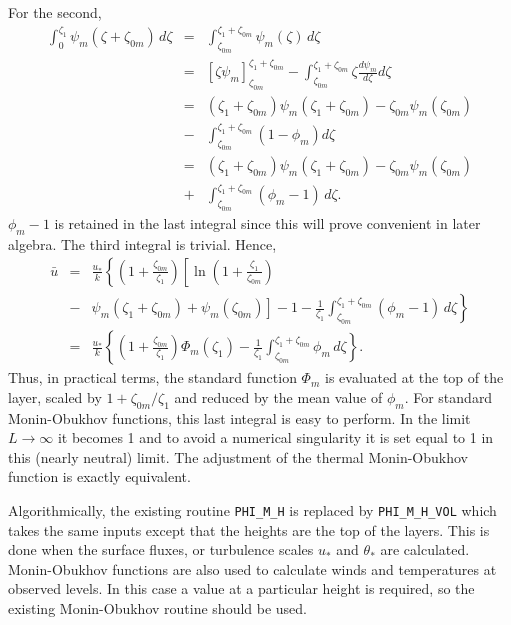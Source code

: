 \documentclass{UMDP_article}
\begin{document}
For the second,
\begin{eqnarray}
  \int_0^{\zeta_1} \psi_m(\zeta+\zeta_{0m}) \, d\zeta &=&
  \int_{\zeta_{0m}}^{\zeta_1+\zeta_{0m}} \psi_m(\zeta) \, d\zeta \\
  &=& \left [ \zeta \psi_m
  \right ]_{\zeta_{0m}}^{\zeta_1+\zeta_{0m}}
  - \int_{\zeta_{0m}}^{\zeta_1+\zeta_{0m}} \zeta \frac{d\psi_m}{d\zeta}
  d\zeta \nonumber \\
  &=& (\zeta_1+\zeta_{0m}) \psi_m(\zeta_1+\zeta_{0m}) - \zeta_{0m}
  \psi_m(\zeta_{0m}) \nonumber \\ &-& \int_{\zeta_{0m}}^{\zeta_1+\zeta_{0m}}
  (1-\phi_m) d\zeta \nonumber \\
  &=& (\zeta_1+\zeta_{0m}) \psi_m(\zeta_1+\zeta_{0m}) - \zeta_{0m}
  \psi_m(\zeta_{0m}) \nonumber \\ &+& \int_{\zeta_{0m}}^{\zeta_1+\zeta_{0m}}
  (\phi_m -1) \, d\zeta . \nonumber
\end{eqnarray}
$\phi_m-1$ is retained in the last integral since this will prove
convenient in later algebra.  The third integral is trivial. Hence,
\begin{eqnarray}
  \bar u &=& \frac{u_*}{k} \left \{
    \left ( 1+ \frac{\zeta_{0m}}{\zeta_1} \right ) \left [
      \ln \left ( 1+ \frac{\zeta_1}{\zeta_{0m}} \right ) \right . \right .  \\
  &-& \left . \left . \psi_m(\zeta_1+\zeta_{0m}) + \psi_m(\zeta_{0m}) \right ] -1
    - \frac{1}{\zeta_1} \int_{\zeta_{0m}}^{\zeta_1+\zeta_{0m}}
    (\phi_m -1) \, d\zeta \right \} \nonumber \\
  &=& \frac{u_*}{k} \left \{ \left ( 1+ \frac{\zeta_{0m}}{\zeta_1} \right )
    \Phi_m(\zeta_1) - \frac{1}{\zeta_1} \int_{\zeta_{0m}}^{\zeta_1+\zeta_{0m}}
    \phi_m  \, d\zeta \right \} . \nonumber
\end{eqnarray}
Thus, in practical terms, the standard function $\Phi_m$ is evaluated
at the top of the layer, scaled by $1+\zeta_{0m}/\zeta_1$ and reduced
by the mean value of $\phi_m$. For standard Monin-Obukhov functions,
this last integral is easy to perform. In the limit $L \rightarrow
\infty$ it becomes 1 and to avoid a numerical singularity it is set
equal to 1 in this (nearly neutral) limit.  The adjustment of the
thermal Monin-Obukhov function is exactly equivalent.

Algorithmically, the existing routine {\tt PHI\_M\_H} is replaced by
{\tt PHI\_M\_H\_VOL} which takes the same inputs except that the
heights are the top of the layers. This is done when the surface
fluxes, or turbulence scales $u_*$ and $\theta_*$ are
calculated. Monin-Obukhov functions are also used to calculate winds
and temperatures at observed levels. In this case a value at a
particular height is required, so the existing Monin-Obukhov routine
should be used.
\end{document}
